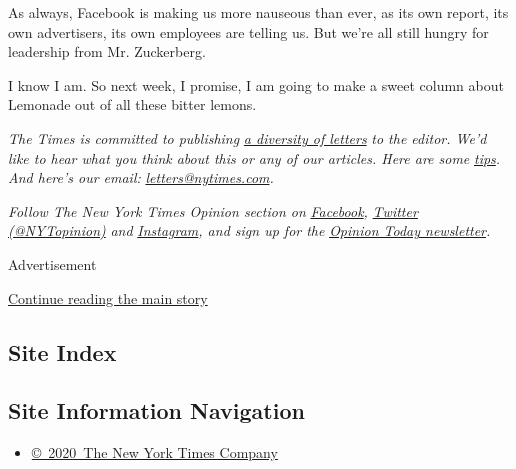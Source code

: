 As always, Facebook is making us more nauseous than ever, as its own
report, its own advertisers, its own employees are telling us. But we're
all still hungry for leadership from Mr. Zuckerberg.

I know I am. So next week, I promise, I am going to make a sweet column
about Lemonade out of all these bitter lemons.

\emph{The Times is committed to publishing}
\href{https://www.nytimes.com/2019/01/31/opinion/letters/letters-to-editor-new-york-times-women.html}{\emph{a
diversity of letters}} \emph{to the editor. We'd like to hear what you
think about this or any of our articles. Here are some}
\href{https://help.nytimes.com/hc/en-us/articles/115014925288-How-to-submit-a-letter-to-the-editor}{\emph{tips}}\emph{.
And here's our email:}
\href{mailto:letters@nytimes.com}{\emph{letters@nytimes.com}}\emph{.}

\emph{Follow The New York Times Opinion section on}
\href{https://www.facebook.com/nytopinion}{\emph{Facebook}}\emph{,}
\href{http://twitter.com/NYTOpinion}{\emph{Twitter (@NYTopinion)}}
\emph{and}
\href{https://www.instagram.com/nytopinion/}{\emph{Instagram}}\emph{,
and sign up for the}
\href{http://www.nytimes.com/newsletters/opiniontoday/}{\emph{Opinion
Today newsletter}}\emph{.}

Advertisement

\protect\hyperlink{after-bottom}{Continue reading the main story}

\hypertarget{site-index}{%
\subsection{Site Index}\label{site-index}}

\hypertarget{site-information-navigation}{%
\subsection{Site Information
Navigation}\label{site-information-navigation}}

\begin{itemize}
\tightlist
\item
  \href{https://help.nytimes.com/hc/en-us/articles/115014792127-Copyright-notice}{©~2020~The
  New York Times Company}
\end{itemize}

